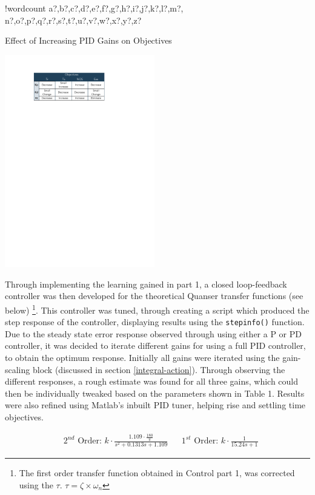 \documentclass[11pt]{article}
\newcounter{words}
\newenvironment{counted}{%
  \setcounter{words}{0}
  \SearchList!{wordcount}{\stepcounter{words}}
    {a?,b?,c?,d?,e?,f?,g?,h?,i?,j?,k?,l?,m?,
    n?,o?,p?,q?,r?,s?,t?,u?,v?,w?,x?,y?,z?}
  \UndoBoundary{'}
  \SearchOrder{p;}}{%
  \StopSearching}
\begin{document}
\begin{counted}
\begin{table}
\vspace{-20pt}
\caption{Effect of Increasing PID Gains on Objectives}
\vspace{-5pt}
\centering
 \includegraphics[trim = 0 0 0 0, clip, width=0.49\textwidth]{tableobj.pdf}
 \vspace{-20pt}
 \label{paramtab}
\end{table}

Through implementing the learning gained in part 1, a closed
loop-feedback controller was then developed for the theoretical Quanser
transfer functions (see below)
\footnote{The first order transfer function obtained in Control part 1, was corrected using the $\tau$. $\tau = \zeta \times \omega_n$}.
This controller was tuned, through creating a script which produced the
step response of the controller, displaying results using the
\texttt{stepinfo()} function. Due to the steady state error response
observed through using either a P or PD controller, it was decided to
iterate different gains for using a full PID controller, to obtain the
optimum response. Initially all gains were iterated using the
gain-scaling block (discussed in section \ref{integral-action}). Through
observing the different responses, a rough estimate was found for all
three gains, which could then be individually tweaked based on the
parameters shown in Table 1. Results were also refined using Matlab's
inbuilt PID tuner, helping rise and settling time objectives.

\begin{align*}
&\text{$2^{nd}$ Order: }k \cdot \frac { 1.109\cdot \frac{180} {\pi} }{ s^2 + 0.1313s +1.109 }
&&\text{$1^{st}$ Order: }k \cdot \frac { 1 }{ 15.24s +1 }
\end{align*}


\end{counted}
\end{document}
